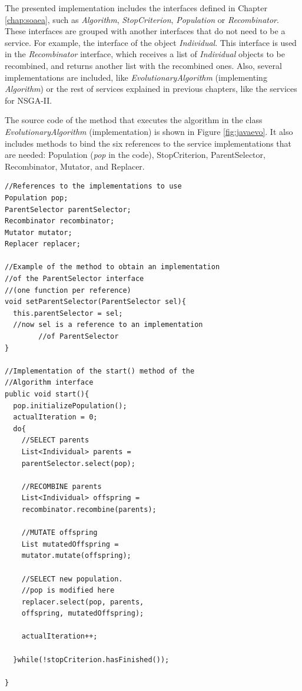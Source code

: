 The presented implementation includes the interfaces defined in Chapter \ref{chap:soaea}, such as {\em Algorithm}, {\em StopCriterion}, {\em Population} or {\em Recombinator}. These interfaces are grouped with another interfaces that do not need to be a service. For example, the interface of the object {\em Individual}. This interface is used in the {\em Recombinator} interface, which receives a list of {\em Individual} objects to be recombined, and returns another list with the recombined ones.
Also, several implementations are included, like {\em EvolutionaryAlgorithm} (implementing {\em  Algorithm}) or the rest of  services explained in previous chapters, like the services for NSGA-II.


The source code of the method that executes the algorithm in the class {\em EvolutionaryAlgorithm} (implementation) is shown in Figure \ref{fig:javaevo}. It also includes methods to bind the six references to the service implementations that are needed: Population ({\em pop} in the code), StopCriterion, ParentSelector, Recombinator, Mutator, and Replacer. 


\newsavebox{\mintedbox}
\begin{lrbox}{\mintedbox}
\begin{minipage}{10cm}
\begin{verbatim}
//References to the implementations to use
Population pop;
ParentSelector parentSelector;
Recombinator recombinator;
Mutator mutator;
Replacer replacer;

//Example of the method to obtain an implementation
//of the ParentSelector interface 
//(one function per reference)
void setParentSelector(ParentSelector sel){
  this.parentSelector = sel;
  //now sel is a reference to an implementation 
        //of ParentSelector
}

//Implementation of the start() method of the 
//Algorithm interface
public void start(){
  pop.initializePopulation();
  actualIteration = 0;
  do{
    //SELECT parents
    List<Individual> parents = 
    parentSelector.select(pop);
      
    //RECOMBINE parents
    List<Individual> offspring = 
    recombinator.recombine(parents);
      
    //MUTATE offspring
    List mutatedOffspring = 
    mutator.mutate(offspring);
      
    //SELECT new population. 
    //pop is modified here
    replacer.select(pop, parents, 
    offspring, mutatedOffspring);
      
    actualIteration++;
      
  }while(!stopCriterion.hasFinished());
    
}
\end{verbatim}
\end{minipage}
\end{lrbox}


